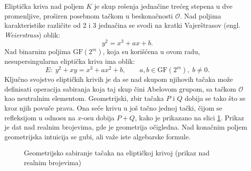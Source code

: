 Eliptička kriva nad poljem $K$ je skup rešenja jednačine trećeg stepena u dve promenljive, proširen posebnom tačkom u beskonačnosti $\mathcal{O}$. Nad poljima karakteristike različite od 2 i 3 jednačina se svodi na kratki Vajerštrasov (engl. \textit{Weierstrass}) oblik:
\begin{equation}
    y^2 = x^3 + ax + b.
\end{equation}
Nad binarnim poljima $\mathrm{GF}(2^m)$, koja su korišćena u ovom radu, nesupersingularna eliptička kriva ima oblik:
\begin{equation}
    E:\; y^2 + xy = x^3 + ax^2 + b, \qquad a, b \in \mathrm{GF}(2^m),\; b \neq 0.
    \label{eq:binarna_kriva}
\end{equation}
\smallbreak
Ključno svojstvo eliptičkih krivih je da se nad skupom njihovih tačaka može definisati operacija sabiranja koja taj skup čini Abelovom grupom, sa tačkom $\mathcal{O}$ kao neutralnim elementom. Geometrijski, zbir tačaka $P$ i $Q$ dobija se tako što se kroz njih povuče prava. Ona seče krivu u još tačno jednoj tački, čijom se refleksijom u odnosu na $x$-osu dobija $P+Q$, kako je prikazano na slici \ref{fig:ec_sabiranje}. Prikaz je dat nad realnim brojevima, gde je geometrija očigledna. Nad konačnim poljem geometrijska intuicija se gubi, ali važe iste algebarske formule.

\begin{figure}[H]
\centering
{}
\caption{Geometrijsko sabiranje tačaka na eliptičkoj krivoj (prikaz nad realnim brojevima)}
\label{fig:ec_sabiranje}
\end{figure}

